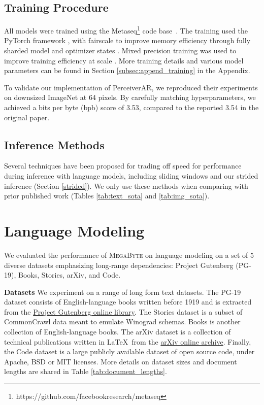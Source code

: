 \subsection{Training Procedure}
    \label{sec:training_proc}
    All models were trained using the Metaseq\footnote{https://github.com/facebookresearch/metaseq} code base~\cite{OPT}. The training used the PyTorch framework \cite{pytorch}, with fairscale to improve memory efficiency through fully sharded model and optimizer states \cite{fairscale}. Mixed precision training was used to improve training efficiency at scale \cite{mixedprecision}. More training details and various model parameters can be found in Section \ref{subsec:append_training} in the Appendix. 

To validate our implementation of PerceiverAR, we reproduced their experiments on downsized ImageNet at 64 pixels. By carefully matching hyperparameters, we achieved a bits per byte (bpb) score of 3.53, compared to the reported 3.54 in the original paper.

\subsection{Inference Methods} Several techniques have been proposed for trading off speed for performance during inference with language models, including sliding windows \cite{shortformer} and our strided inference (Section \ref{strided}). We only use these methods when comparing with prior published work (Tables \ref{tab:text_sota} and \ref{tab:img_sota}).

\section{Language Modeling} We evaluated the performance of \textsc{MegaByte} on language modeling on a set of 5 diverse datasets emphasizing long-range dependencies: Project Gutenberg (PG-19), Books, Stories, arXiv, and Code. 

\textbf{Datasets} We experiment on a range of long form text datasets. The PG-19 dataset \cite{pg19} consists of English-language books written before 1919 and is extracted from the \href{https://www.gutenberg.org/}{Project Gutenberg online library}. The Stories dataset \cite{stories} is a subset of CommonCrawl data meant to emulate Winograd schemas. Books \cite{pile} is another collection of English-language books. The arXiv dataset is a collection of technical publications written in \LaTeX ~from the \href{arxiv.org}{arXiv online archive}. Finally, the Code dataset is a large publicly available dataset of open source code, under Apache, BSD or MIT licenses. More details on dataset sizes and document lengths are shared in Table \ref{tab:document_lengths}. 

